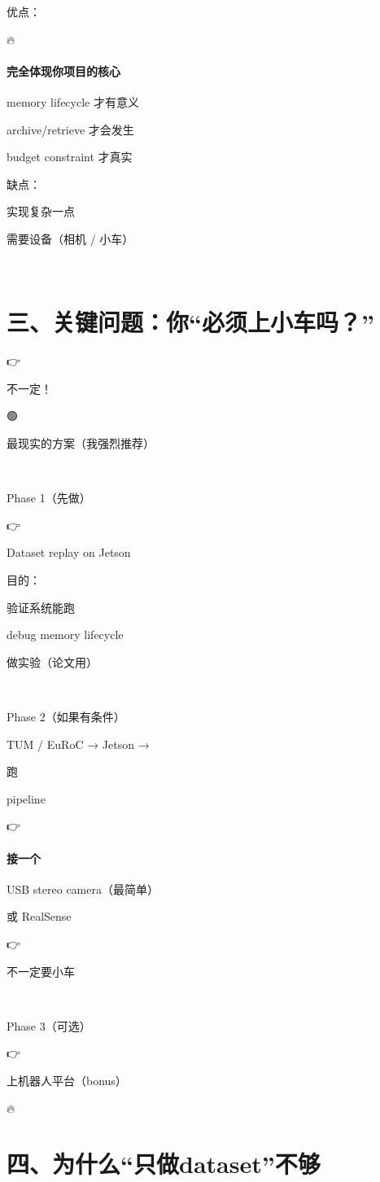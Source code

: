 \documentclass[12pt]{article}
\begin{document}
优点：

🔥

\paragraph{完全体现你项目的核心}
memory lifecycle 才有意义

archive/retrieve 才会发生

budget constraint 才真实

缺点：

实现复杂一点

需要设备（相机 / 小车）

🧩

\section{三、关键问题：你“必须上小车吗？”}
👉

不一定！

🟢

最现实的方案（我强烈推荐）

🧪

Phase 1（先做）

👉

Dataset replay on Jetson

目的：

验证系统能跑

debug memory lifecycle

做实验（论文用）

🤖

Phase 2（如果有条件）

TUM / EuRoC → Jetson →

跑

pipeline

👉

\paragraph{接一个}
USB stereo camera（最简单）

或 RealSense

👉

不一定要小车

🚗

Phase 3（可选）

👉

上机器人平台（bonus）

🔥

\section{四、为什么“只做dataset”不够}
\end{document}
